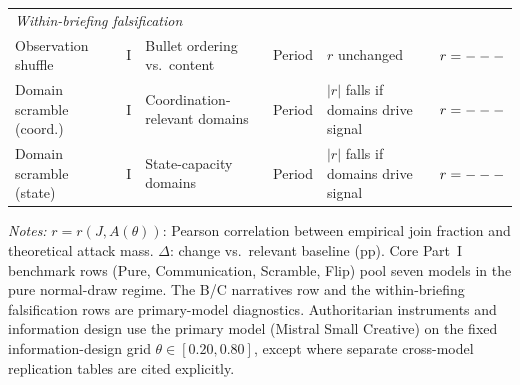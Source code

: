 \begin{table}[htbp]
{\begin{tabular}{lllllr}
\multicolumn{6}{l}{\textit{Within-briefing falsification}} \\
Observation shuffle   & I  & Bullet ordering vs.\ content & Period & $r$ unchanged          & $r = ---$ \\
Domain scramble (coord.)  & I  & Coordination-relevant domains & Period & $|r|$ falls if domains drive signal & $r = ---$ \\
Domain scramble (state)   & I  & State-capacity domains       & Period & $|r|$ falls if domains drive signal & $r = ---$ \\
\bottomrule
\end{tabular}
}
\vspace{0.25em}
\parbox{\textwidth}{\footnotesize\emph{Notes:} $r = r(J, A(\theta))$: Pearson correlation between empirical join fraction and theoretical attack mass. $\Delta$: change vs.\ relevant baseline (pp). Core Part~I benchmark rows (Pure, Communication, Scramble, Flip) pool seven models in the pure normal-draw regime. The B/C narratives row and the within-briefing falsification rows are primary-model diagnostics. Authoritarian instruments and information design use the primary model (Mistral Small Creative) on the fixed information-design grid $\theta \in [0.20, 0.80]$, except where separate cross-model replication tables are cited explicitly.}
\end{table}
